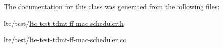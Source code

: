 The documentation for this class was generated from the following files\+:\begin{DoxyCompactItemize}
\item 
lte/test/\hyperlink{lte-test-tdmt-ff-mac-scheduler_8h}{lte-\/test-\/tdmt-\/ff-\/mac-\/scheduler.\+h}\item 
lte/test/\hyperlink{lte-test-tdmt-ff-mac-scheduler_8cc}{lte-\/test-\/tdmt-\/ff-\/mac-\/scheduler.\+cc}\end{DoxyCompactItemize}
